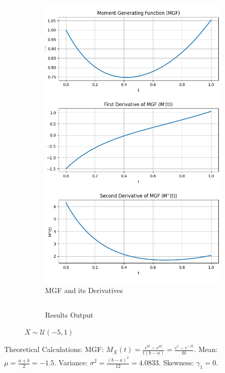 \documentclass{article}
\begin{document}
\begin{figure}[H]
\begin{subfigure}{0.45\textwidth}
    \centering \includegraphics[width=\linewidth]{results/section1/b1(2).png}
    \caption{MGF and its Derivatives}
  \end{subfigure}
  \begin{subfigure}{\textwidth}
    \inputminted{text}{results/section1/b1.txt}
    \caption{Results Output}
  \end{subfigure}
  \caption{$X\sim \mathcal{U}(-5, 1)$}
\end{figure}
Theoretical Calculations:
MGF: $M_X(t) = \frac{e^{bt} - e^{at}}{t(b-a)}=\frac{e^{t}-e^{-5t}}{6t}$.
Mean: $\mu = \frac{a+b}{2}=-1.5$.
Variance: $\sigma^2 = \frac{(b-a)^2}{12} = 4.0833$.
Skewness: $\gamma_1 = 0$.
\end{document}
